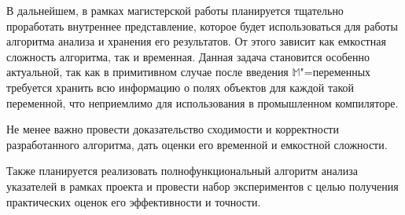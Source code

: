 \documentclass[14pt,titlepage,draft]{extarticle}
\newcommand{\M}{\ensuremath{\mathbb{M}}}
\begin{document}

    В дальнейшем, в рамках магистерской работы планируется тщательно
    проработать внутреннее представление, которое будет использоваться для
    работы алгоритма анализа и хранения его результатов. От этого зависит как
    емкостная сложность алгоритма, так и временная. Данная задача становится
    особенно актуальной, так как в примитивном случае после введения
    \M"=переменных требуется хранить всю информацию о полях объектов для каждой
    такой переменной, что неприемлимо для использования в промышленном
    компиляторе.

    Не менее важно провести доказательство сходимости и корректности
    разработанного алгоритма, дать оценки его временной и емкостной сложности.

    Также планируется реализовать полнофункциональный алгоритм анализа
    указателей в рамках проекта  и провести набор
    экспериментов с целью получения практических оценок его эффективности и
    точности.


  \newpage
  
\end{document}
